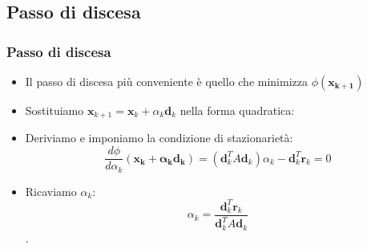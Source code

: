 \documentclass[10pt]{beamer}
\begin{document}
    
    
\subsection{Passo di discesa}
\begin{frame} 
\frametitle{Passo di discesa}
\begin{itemize}

\item Il passo di discesa più conveniente è quello che \alert{ minimizza $\phi(\mathbf{x_{k+1}})$}

   \item Sostituiamo $\mathbf{x}_{k+1}=\mathbf{x}_{k}+\alpha_k\mathbf{d}_{k}$ nella forma quadratica: \vspace*{13px}
   
   \vspace*{12px}
    
    \item Deriviamo e imponiamo la condizione di stazionarietà:
    $$
    \frac{d\phi}{d\alpha_k}(\mathbf{\mathbf{x}_{k}+\alpha_k\mathbf{d}_{k}})=\left(\mathbf{d}_k^TA\mathbf{d}_k\right)\alpha_k-\mathbf{d}_k^T\mathbf{r}_k=0 $$
    \item Ricaviamo $\alpha_k$:
$$\alpha_k=\frac{\mathbf{d}_k^T \mathbf{r}_k}{\mathbf{d}_k^T A \mathbf{d}_k}$$ .

\end{itemize}
\end{frame}
\end{document}
